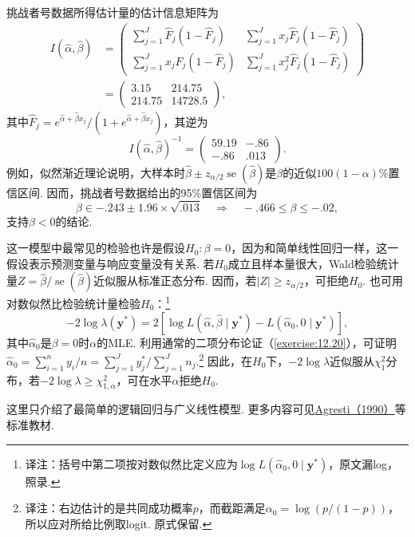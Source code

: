 \enlargethispage{1pt}
\begin{example}[挑战者号数据续]\label{ex:12.3.2}
挑战者号数据所得估计量的估计信息矩阵为
$$\begin{aligned}
I(\hat\alpha,\hat\beta)&=\begin{pmatrix}
\sum_{j=1}^J\hat F_j(1-\hat F_j)&\sum_{j=1}^Jx_j\hat F_j(1-\hat F_j)\\
\sum_{j=1}^Jx_j\hat F_j(1-\hat F_j)&\sum_{j=1}^Jx_j^2\hat F_j(1-\hat F_j)
\end{pmatrix}\\
&=\begin{pmatrix}3.15&214.75\\214.75&14728.5\end{pmatrix},
\end{aligned}$$
其中$\hat F_j=e^{\hat\alpha+\hat\beta x_j}/(1+e^{\hat\alpha+\hat\beta x_j})$，其逆为
$$I(\hat\alpha,\hat\beta)^{-1}=\begin{pmatrix}59.19&-.86\\-.86&.013\end{pmatrix}.$$
例如，似然渐近理论说明，大样本时$\hat\beta\pm z_{\alpha/2}\operatorname{se}(\hat\beta)$是$\beta$的近似$100(1-\alpha)\%$置信区间. 因而，挑战者号数据给出的95\%置信区间为
$$\beta\in-.243\pm1.96\times\sqrt{.013}\quad\Rightarrow\quad-.466\le\beta\le-.02,$$
支持$\beta<0$的结论.
\end{example}

这一模型中最常见的检验也许是假设$H_0:\beta=0$，因为和简单线性回归一样，这一假设表示预测变量与响应变量没有关系. 若$H_0$成立且样本量很大，Wald检验统计量$Z=\hat\beta/\operatorname{se}(\hat\beta)$近似服从标准正态分布. 因而，若$|Z|\ge z_{\alpha/2}$，可拒绝$H_0$. 也可用对数似然比检验统计量检验$H_0$：\footnote{译注：括号中第二项按对数似然比定义应为$\log L(\hat\alpha_0,0\mid\boldsymbol y^*)$，原文漏log，照录.}
$$-2\log\lambda(\boldsymbol y^*)=2[\log L(\hat\alpha,\hat\beta\mid\boldsymbol y^*)-L(\hat\alpha_0,0\mid\boldsymbol y^*)],$$
其中$\hat\alpha_0$是$\beta=0$时$\alpha$的MLE. 利用通常的二项分布论证（\autoref{exercise:12.20}），可证明$\hat\alpha_0=\sum_{i=1}^ny_i/n=\sum_{j=1}^Jy_j^*/\sum_{j=1}^Jn_j$.\footnote{译注：右边估计的是共同成功概率$p$，而截距满足$\alpha_0=\log(p/(1-p))$，所以应对所给比例取logit. 原式保留.} 因此，在$H_0$下，$-2\log\lambda$近似服从$\chi_1^2$分布，若$-2\log\lambda\ge\chi_{1,\alpha}^2$，可在水平$\alpha$拒绝$H_0$.

这里只介绍了最简单的逻辑回归与广义线性模型. 更多内容可见\hyperref[bib:source1]{Agresti（1990）}等标准教材.

